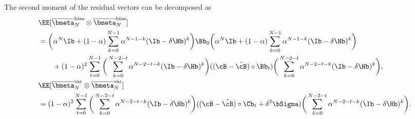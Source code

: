 \documentclass[11pt]{article}
\newcommand{\obmeta}{\overline{\bmeta}}
\begin{document}
\begin{lemma}\label{lemma:telescope}
The second moment of the residual vectors can be decomposed as
\begin{align*}
&\EE[\obmeta_N^{\mathrm{bias}}\otimes\obmeta_N^{\mathrm{bias}}]\\
&=\bigg(\alpha^N\Ib+(1-\alpha)\sum_{k=0}^{N-1}\alpha^{N-1-k}(\Ib-\delta\Hb)^k\bigg)\Bb_0\bigg(\alpha^N\Ib+(1-\alpha)\sum_{k=0}^{N-1}\alpha^{N-1-k}(\Ib-\delta\Hb)^k\bigg)\\
&\qquad+(1-\alpha)^2\sum_{t=0}^{N-1}\bigg(\sum_{k=0}^{N-2-t}\alpha^{N-2-t-k}(\Ib-\delta\Hb)^k\bigg)((\cB-\tilde\cB)\circ\Bb_t)\bigg(\sum_{k=0}^{N-2-t}\alpha^{N-2-t-k}(\Ib-\delta\Hb)^k\bigg),\\
&\EE[\obmeta_N^{\mathrm{var}}\otimes\obmeta_N^{\mathrm{var}}]\\
&=(1-\alpha)^2\sum_{t=0}^{N-1}\bigg(\sum_{k=0}^{N-2-t}\alpha^{N-2-t-k}(\Ib-\delta\Hb)^k\bigg)((\cB-\tilde\cB)\circ\Cb_t+\delta^2\bSigma)\bigg(\sum_{k=0}^{N-2-t}\alpha^{N-2-t-k}(\Ib-\delta\Hb)^k\bigg).
\end{align*}
\end{lemma}
\end{document}
